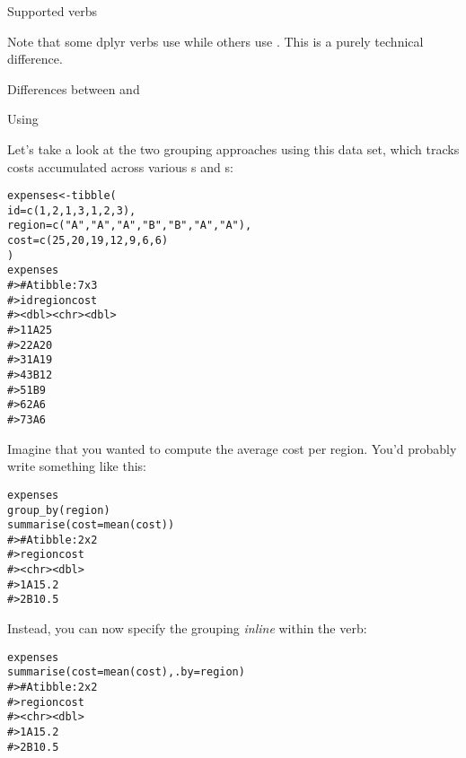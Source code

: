 \documentclass[a4paper]{book}
\begin{document}
\begin{Description}
\begin{SubSection}{Supported verbs}
\begin{itemize}
\end{itemize}


Note that some dplyr verbs use  while others use .
This is a purely technical difference.
\end{SubSection}


%
\begin{SubSection}{Differences between  and }


\end{SubSection}


%
\begin{SubSection}{Using }

Let's take a look at the two grouping approaches using this  data set, which tracks costs accumulated across various s and s:

\begin{alltt}expenses <- tibble(
  id = c(1, 2, 1, 3, 1, 2, 3),
  region = c("A", "A", "A", "B", "B", "A", "A"),
  cost = c(25, 20, 19, 12, 9, 6, 6)
)
expenses
#> # A tibble: 7 x 3
#>      id region  cost
#>   <dbl> <chr>  <dbl>
#> 1     1 A         25
#> 2     2 A         20
#> 3     1 A         19
#> 4     3 B         12
#> 5     1 B          9
#> 6     2 A          6
#> 7     3 A          6
\end{alltt}


Imagine that you wanted to compute the average cost per region.
You'd probably write something like this:

\begin{alltt}expenses %>%
  group_by(region) %>%
  summarise(cost = mean(cost))
#> # A tibble: 2 x 2
#>   region  cost
#>   <chr>  <dbl>
#> 1 A       15.2
#> 2 B       10.5
\end{alltt}


Instead, you can now specify the grouping \emph{inline} within the verb:

\begin{alltt}expenses %>%
  summarise(cost = mean(cost), .by = region)
#> # A tibble: 2 x 2
#>   region  cost
#>   <chr>  <dbl>
#> 1 A       15.2
#> 2 B       10.5
\end{alltt}



\end{SubSection}
\end{Description}
\end{document}
